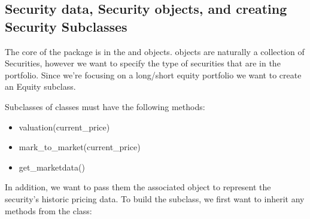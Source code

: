 \documentclass[letterpaper,10pt,english]{sphinxmanual}
\begin{document}
\subsection{Security data, Security objects, and creating Security Subclasses}
\label{\detokenize{gettingstarted:security-data-security-objects-and-creating-security-subclasses}}
\sphinxAtStartPar
The core of the package is in the  and 
objects.  objects are naturally a collection of Securities,
however we want to specify the type of securities that are in the
portfolio. Since we’re focusing on a long/short equity portfolio we want
to create an Equity subclass.

\sphinxAtStartPar
Subclasses of  classes must have the following methods:
\begin{itemize}
\item {} 
\sphinxAtStartPar
valuation(current\_price)

\item {} 
\sphinxAtStartPar
mark\_to\_market(current\_price)

\item {} 
\sphinxAtStartPar
get\_marketdata()

\end{itemize}

\sphinxAtStartPar
In addition, we want to pass them the associated  object
to represent the security’s historic pricing data. To build the
 subclass, we first want to inherit any methods from the
 class:

\begin{sphinxVerbatim}[commandchars=\\\{\}]
 

     
              
          
          
          
          
            
          
          
\end{sphinxVerbatim}
\end{document}
